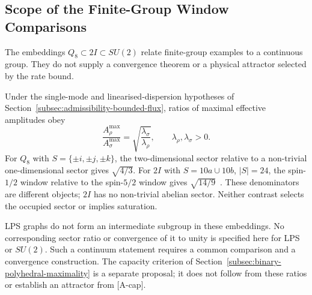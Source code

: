 \subsection{Scope of the Finite-Group Window Comparisons}
  \label{subsec:SU2-thread-status}

  The embeddings $Q_8\subset2I\subset SU(2)$ relate finite-group examples to a continuous group.
  They do not supply a convergence theorem or a physical attractor selected by the rate bound.

  Under the single-mode and linearised-dispersion hypotheses of
  Section~\ref{subsec:admissibility-bounded-flux}, ratios of maximal effective amplitudes obey
  \begin{equation}
    \frac{A_\rho^{\max}}{A_\sigma^{\max}}
    =\sqrt{\frac{\lambda_\sigma}{\lambda_\rho}},\qquad
    \lambda_\rho,\lambda_\sigma>0.
  \end{equation}
  For $Q_8$ with $S=\{\pm i,\pm j,\pm k\}$, the two-dimensional sector relative to a non-trivial
  one-dimensional sector gives $\sqrt{4/3}$.
  For $2I$ with $S=10a\cup10b$, $|S|=24$, the spin-$1/2$ window relative to the spin-$5/2$ window
  gives $\sqrt{14/9}$~\cite{Beau2026a1}.
  These denominators are different objects; $2I$ has no non-trivial abelian sector.
  Neither contrast selects the occupied sector or implies saturation.

  LPS graphs do not form an intermediate subgroup in these embeddings.
  No corresponding sector ratio or convergence of it to unity is specified here for LPS or $SU(2)$.
  Such a continuum statement requires a common comparison and a convergence construction.
  The capacity criterion of Section~\ref{subsec:binary-polyhedral-maximality} is a separate proposal;
  it does not follow from these ratios or establish an attractor from [A-cap].
